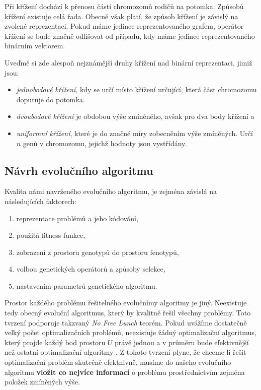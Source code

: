 Při křížení dochází k přenosu částí chromozomů rodičů na potomka. Způsobů křížení
existuje celá řada. Obecně však platí, že způsob křížení je závislý na zvolené 
reprezentaci. Pokud máme jedince reprezentovaného grafem, operátor křížení 
se bude značně odlišovat od případu, kdy máme jedince reprezentovaného binárním
vektorem. 

Uveďmě si zde alespoň nejznámější druhy křížení nad binární reprezentaci, jimiž jsou:
\begin{itemize}
	\item \textit{jednobodové křížení}, kdy se určí místo křížení určující,
		která část chromozomu doputuje do potomka.
		
	\item \textit{dvoubodové křížení} je obdobou výše zmíněného, avšak pro dva body
		křížení a
	\item \textit{uniformní křížení}, které je do značné míry zobecněním výše zmíněných.
		 Určí $n$ genů v chromozomu, jejichž hodnoty jsou vystřídány.
\end{itemize}

\subsection{Návrh evolučního algoritmu}

Kvalita námi navrženého evolučního algoritmu, je zejména závislá na následujících faktorech:
\begin{enumerate}
	\item reprezentace problémů a jeho kódování,
	\item použitá fitness funkce,
	\item zobrazení z prostoru genotypů do prostoru fenotypů,
	\item volbou genetických operátorů a způsoby selekce,
	\item nastavením parametrů genetického algoritmu.
\end{enumerate}

Prostor každého problému řešitelného evolučnímy algoritmy je jiný. Neexistuje tedy obecný
evoluční algoritmus, který by kvalitně řešil všechny problémy. Toto tvrzení podporuje takzvaný
\textit{No Free Lunch} teorém. Pokud uvážíme dostatečně velký počet optimalizačních problémů,
neexistuje žádný optimalizační algoritmus, který projde každý bod prostoru $U$ právě jednou
a v průměru bude efektivnější než ostatní optimalizační algoritmy \cite{nflteorem, evolution_hardware}. 
Z tohoto tvrzení plyne, že chceme-li řešit optimalizační problém skutečně efektnivně, musíme 
do našeho evolučního algoritmu \textbf{vložit co nejvíce informací} o problému prostřednictvím 
zejména položek zmíněných výše.

